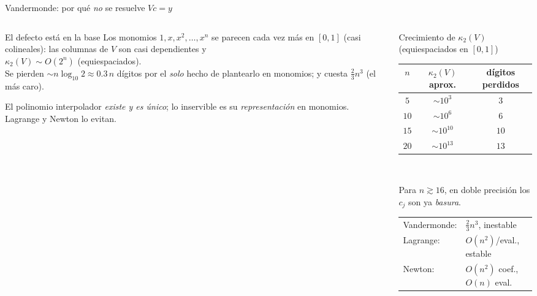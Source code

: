 \documentclass[aspectratio=169,10pt]{beamer}
\begin{document}
\begin{frame}{Vandermonde: por qué \emph{no} se resuelve $Vc=y$}
\begin{columns}[T]
\begin{column}{0.46\textwidth}
\begin{cardidea}{El defecto está en la base}{\faExclamationTriangle}
{\footnotesize Los monomios $1,x,x^2,\dots,x^n$ se parecen cada vez más en $[0,1]$ (casi colineales): las columnas de $V$ son casi dependientes y\\[0.8mm]
$\kappa_2(V)\sim O(2^n)$ \; (equiespaciados).\\[1.0mm]
Se pierden $\sim n\log_{10}2\approx0.3\,n$ dígitos por el \emph{solo} hecho de plantearlo en monomios; y cuesta $\tfrac23n^3$ (el más caro).}
\end{cardidea}
\vspace{1mm}
\begin{cardnota}[\faInfoCircle]
{\footnotesize El polinomio interpolador \emph{existe y es único}; lo inservible es su \emph{representación} en monomios. Lagrange y Newton lo evitan.}
\end{cardnota}
\end{column}
\begin{column}{0.52\textwidth}
\begin{cardgear}{Crecimiento de $\kappa_2(V)$ (equiespaciados en $[0,1]$)}{\faTable}
\centering
{\footnotesize\renewcommand{\arraystretch}{1.18}\setlength{\tabcolsep}{7pt}
\begin{tabular}{c|cc}
$n$ & $\kappa_2(V)$ aprox. & dígitos perdidos\\\hline
$5$ &$\sim10^{3}$ & $3$\\
$10$&$\sim10^{6}$ & $6$\\
$15$&$\sim10^{10}$& $10$\\
$20$&$\sim10^{13}$& $13$\\
\end{tabular}}\\[1.4mm]
{\footnotesize Para $n\gtrsim16$, en doble precisión los $c_j$ son ya \emph{basura}.\\[0.8mm]
\begin{tabular}{@{}l@{\;}l@{}}
Vandermonde:&$\tfrac23n^3$, inestable\\
Lagrange:&$O(n^2)$/eval., estable\\
Newton:&$O(n^2)$ coef., $O(n)$ eval.\\
\end{tabular}}
\end{cardgear}
\end{column}
\end{columns}
\end{frame}
\end{document}
